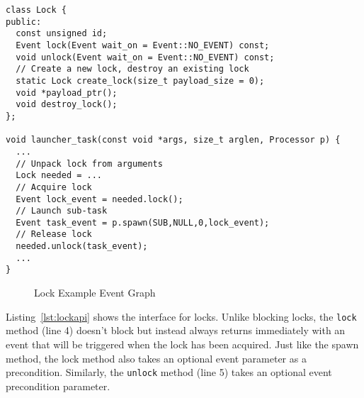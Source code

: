 \begin{lstlisting}[float={t},label={lst:lockapi},caption={Deferred Lock Interface and Example.}]
class Lock {
public:
  const unsigned id;
  Event lock(Event wait_on = Event::NO_EVENT) const;
  void unlock(Event wait_on = Event::NO_EVENT) const;
  // Create a new lock, destroy an existing lock
  static Lock create_lock(size_t payload_size = 0);
  void *payload_ptr();
  void destroy_lock();
};

void launcher_task(const void *args, size_t arglen, Processor p) {
  ...
  // Unpack lock from arguments
  Lock needed = ...
  // Acquire lock
  Event lock_event = needed.lock();
  // Launch sub-task
  Event task_event = p.spawn(SUB,NULL,0,lock_event);
  // Release lock
  needed.unlock(task_event);
  ...
}
\end{lstlisting}

\begin{figure}
\centering
{}
\vspace{-2mm}
\caption{Lock Example Event Graph\label{fig:lockevents}}
\vspace{-4mm}
\end{figure}

Listing~\ref{lst:lockapi} shows the 
interface for locks.  Unlike blocking locks, the {\tt lock} method (line 4) doesn't
block but instead always returns immediately with an event that will be triggered
when the lock has been acquired.  Just like the spawn method, the lock method also 
takes an optional event parameter as a precondition.  Similarly, the {\tt unlock} 
method (line 5) takes an optional event precondition parameter.

